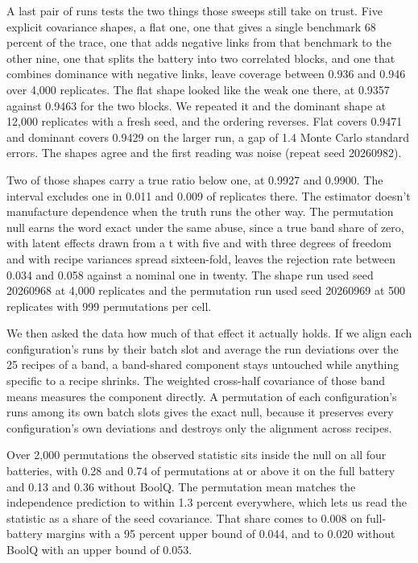 A last pair of runs tests the two things those sweeps still take on trust. Five explicit covariance shapes, a flat one, one that gives a single benchmark 68 percent of the trace, one that adds negative links from that benchmark to the other nine, one that splits the battery into two correlated blocks, and one that combines dominance with negative links, leave coverage between 0.936 and 0.946 over 4,000 replicates. The flat shape looked like the weak one there, at 0.9357 against 0.9463 for the two blocks. We repeated it and the dominant shape at 12,000 replicates with a fresh seed, and the ordering reverses. Flat covers 0.9471 and dominant covers 0.9429 on the larger run, a gap of 1.4 Monte Carlo standard errors. The shapes agree and the first reading was noise (repeat seed 20260982).

Two of those shapes carry a true ratio below one, at 0.9927 and 0.9900. The interval excludes one in 0.011 and 0.009 of replicates there. The estimator doesn't manufacture dependence when the truth runs the other way. The permutation null earns the word exact under the same abuse, since a true band share of zero, with latent effects drawn from a t with five and with three degrees of freedom and with recipe variances spread sixteen-fold, leaves the rejection rate between 0.034 and 0.058 against a nominal one in twenty. The shape run used seed 20260968 at 4,000 replicates and the permutation run used seed 20260969 at 500 replicates with 999 permutations per cell.

We then asked the data how much of that effect it actually holds. If we align each configuration's runs by their batch slot and average the run deviations over the 25 recipes of a band, a band-shared component stays untouched while anything specific to a recipe shrinks. The weighted cross-half covariance of those band means measures the component directly. A permutation of each configuration's runs among its own batch slots gives the exact null, because it preserves every configuration's own deviations and destroys only the alignment across recipes.

Over 2,000 permutations the observed statistic sits inside the null on all four batteries, with 0.28 and 0.74 of permutations at or above it on the full battery and 0.13 and 0.36 without BoolQ. The permutation mean matches the independence prediction to within 1.3 percent everywhere, which lets us read the statistic as a share of the seed covariance. That share comes to 0.008 on full-battery margins with a 95 percent upper bound of 0.044, and to 0.020 without BoolQ with an upper bound of 0.053.

